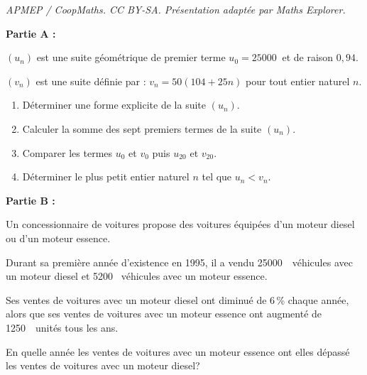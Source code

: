 \documentclass[10pt]{article}
\providecommand{\np}[2][]{{#2~#1}}
\begin{document}
\noindent\textit{APMEP / CoopMaths. CC BY-SA. Présentation adaptée par Maths Explorer.}\par\medskip
\bigskip

\textbf{Partie A :}

\medskip

$\left(u_n\right)$ est une suite géométrique de premier terme $u_0 = \np{25000}$ et de raison $0,94$.

$\left(v_n\right)$ est une suite définie par : $v_n = 50(104 + 25n)$ pour tout entier naturel $n$.

\medskip

\begin{enumerate}
\item Déterminer une forme explicite de la suite $\left(u_n\right)$.
\item Calculer la somme des sept premiers termes de la suite $\left(u_n\right)$. 
\item Comparer les termes $u_0$ et $v_0$ puis $u_{20}$ et $v_{20}$.
\item Déterminer le plus petit entier naturel $n$ tel que $u_n < v_n$.
\end{enumerate}

\bigskip

\textbf{Partie B :}

\medskip

Un concessionnaire de voitures propose des voitures équipées d'un moteur diesel ou d'un moteur essence.

Durant sa première année d'existence en 1995, il a vendu \np{25000}~véhicules avec un moteur diesel et \np{5200} véhicules avec un moteur essence.

Ses ventes de voitures avec un moteur diesel ont diminué de 6\,\% chaque année, alors que ses ventes de voitures avec un moteur essence ont augmenté de \np{1250}~unités tous les ans.

En quelle année les ventes de voitures avec un moteur essence ont elles dépassé les ventes de voitures avec un moteur diesel?


\bigskip
\end{document}
